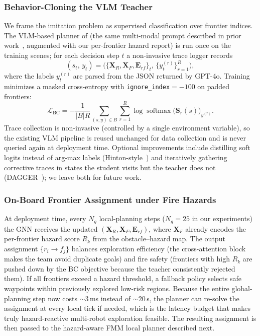 \subsubsection{Behavior-Cloning the VLM Teacher}
We frame the imitation problem as supervised classification over frontier indices. The VLM-based planner of \system (the same multi-modal prompt described in prior work~\cite{11302789}, augmented with our per-frontier hazard report) is run once on the training scenes; for each decision step $t$ a non-invasive trace logger records
\begin{equation}
(s_t,\,y_t)=\big(\{\mathbf{X}_R,\mathbf{X}_F,\mathbf{E}_{rf}\}_t,\,\{y_t^{(r)}\}_{r=1}^{R}\big),
\end{equation}
where the labels $y_t^{(r)}$ are parsed from the JSON returned by GPT-4o. Training minimizes a masked cross-entropy with \texttt{ignore\_index}$=-100$ on padded frontiers:
\begin{equation}
\mathcal{L}_{\text{BC}} = -\frac{1}{|B|R}\sum_{(s,y)\in B}\sum_{r=1}^{R}\log\operatorname{softmax}\!\big(\mathbf{S}_r(s)\big)_{y^{(r)}}.
\end{equation}
Trace collection is non-invasive (controlled by a single environment variable), so the existing VLM pipeline is reused unchanged for data collection and is never queried again at deployment time. Optional improvements include distilling soft logits instead of arg-max labels (Hinton-style~\cite{hinton2015distillation}) and iteratively gathering corrective traces in states the student visits but the teacher does not (DAGGER~\cite{ross2011dagger}); we leave both for future work.

\subsubsection{On-Board Frontier Assignment under Fire Hazards}
At deployment time, every $N_g$ local-planning steps ($N_g{=}25$ in our experiments) the GNN receives the updated $(\mathbf{X}_R,\mathbf{X}_F,\mathbf{E}_{rf})$, where $\mathbf{X}_F$ already encodes the per-frontier hazard score $R_k$ from the obstacle--hazard map. The output assignment $\{r_i \!\to\! f_{j}\}$ balances exploration efficiency (the cross-attention block makes the team avoid duplicate goals) and fire safety (frontiers with high $R_k$ are pushed down by the BC objective because the teacher consistently rejected them). If all frontiers exceed a hazard threshold, a fallback policy selects safe waypoints within previously explored low-risk regions. Because the entire global-planning step now costs ${\sim}3$\,ms instead of ${\sim}20$\,s, the planner can re-solve the assignment at every local tick if needed, which is the latency budget that makes truly hazard-reactive multi-robot exploration feasible. The resulting assignment is then passed to the hazard-aware FMM local planner described next.

